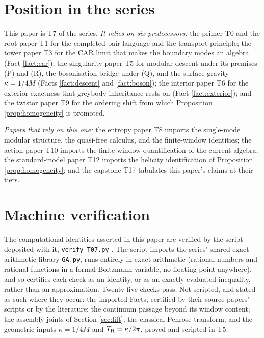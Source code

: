 \section{Position in the series}\label{sec:position}

This paper is T7 of the series. \emph{It relies on six predecessors:} the primer T0 \cite{ButlerT0} and the root paper T1 \cite{ButlerT1} for the completed-pair language and the transport principle; the tower paper T3 \cite{ButlerT3} for the CAR limit that makes the boundary modes an algebra (Fact \ref{fact:car}); the singularity paper T5 \cite{ButlerT5} for modular descent under its premises (P) and (R), the bosonisation bridge under (Q), and the surface gravity $\kappa = 1/4M$ (Facts \ref{fact:descent} and \ref{fact:boson}); the interior paper T6 \cite{ButlerT6} for the exterior exactness that greybody inheritance rests on (Fact \ref{fact:exterior}); and the twistor paper T9 \cite{ButlerT9} for the ordering shift from which Proposition \ref{prop:homogeneity} is promoted.

\emph{Papers that rely on this one:} the entropy paper T8 \cite{ButlerT8} imports the single-mode modular structure, the quasi-free calculus, and the finite-window identities; the action paper T10 \cite{ButlerT10} imports the finite-window quantification of the current algebra; the standard-model paper T12 \cite{ButlerT12} imports the helicity identification of Proposition \ref{prop:homogeneity}; and the capstone T17 \cite{ButlerT17} tabulates this paper's claims at their tiers.

\section{Machine verification}\label{sec:verification}

The computational identities asserted in this paper are verified by the script deposited with it, \texttt{verify\_T07.py} \cite{ButlerVerifyT7}. The script imports the series' shared exact-arithmetic library \texttt{GA.py}, runs entirely in exact arithmetic (rational numbers and rational functions in a formal Boltzmann variable, no floating point anywhere), and so certifies each check as an identity, or as an exactly evaluated inequality, rather than an approximation. Twenty-five checks pass. Not scripted, and stated as such where they occur: the imported Facts, certified by their source papers' scripts or by the literature; the continuum passage beyond its window content; the assembly joints of Section \ref{sec:lift}; the classical Penrose transform; and the geometric inputs $\kappa = 1/4M$ and $T_{\mathrm{H}} = \kappa/2\pi$, proved and scripted in T5.

